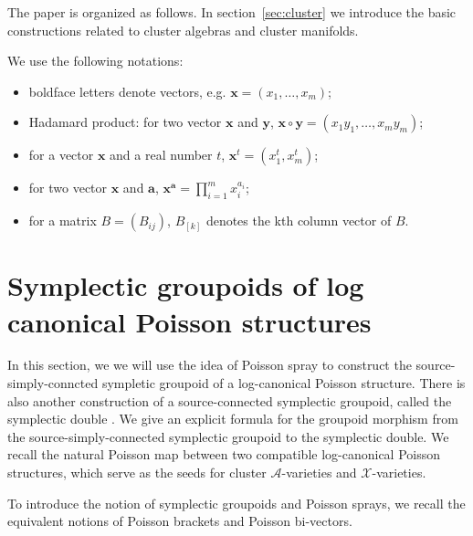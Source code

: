 \documentclass{amsart}
\newcommand{\bfa}{\mathbf{a}}
\newcommand{\bfx}{\mathbf{x}}
\newcommand{\bfy}{\mathbf{y}}
\newcommand{\cA}{\mathcal{A}}
\newcommand{\cX}{\mathcal{X}}
\begin{document}
The paper is organized as follows.
In section~\ref{sec:cluster} we introduce the basic constructions related to cluster algebras and cluster manifolds.

We use the following notations:
\begin{itemize}
	\item boldface letters denote vectors, e.g. $\bfx = (x_1, \ldots, x_m)$;
	\item Hadamard product: for two vector $\bfx$ and $\bfy$, $\bfx \circ \bfy = (x_1y_1, \ldots, x_my_m)$;
	\item for a vector $\bfx$ and a real number $t$, $\bfx^t = (x_1^t, x_m^t)$;
	\item for two vector $\bfx$ and $\bfa$, $\bfx^\bfa = \prod_{i=1}^m x_i^{a_i}$;
	\item for a matrix $B = (B_{ij})$, $B_{[k]}$ denotes the kth column vector of $B$.
\end{itemize}

\section{Symplectic groupoids of log canonical Poisson structures}

In this section, we we will use the idea of Poisson spray \cite{MR2900786} to construct the source-simply-conncted sympletic groupoid of a log-canonical Poisson structure. There is also another construction of a source-connected symplectic groupoid, called the symplectic double \cite{MR2470108}. We give an explicit formula for the groupoid morphism from the source-simply-connected symplectic groupoid to the symplectic double. We recall the natural Poisson map between two compatible log-canonical Poisson structures, which serve as the seeds for cluster $\cA$-varieties and $\cX$-varieties.


To introduce the notion of symplectic groupoids and Poisson sprays, we recall the equivalent notions of Poisson brackets and Poisson bi-vectors.
\end{document}
